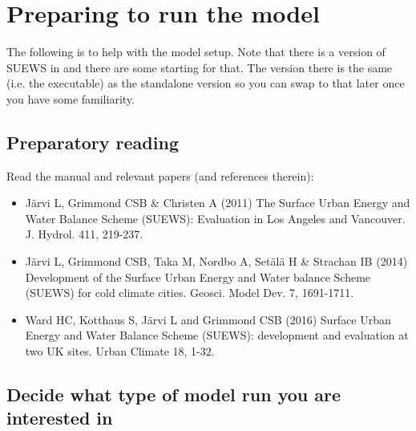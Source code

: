 \documentclass[letterpaper,10pt,english]{sphinxmanual}
\begin{document}
\chapter{Preparing to run the model}
\label{\detokenize{prepare-to-run-the-model::doc}}\label{\detokenize{prepare-to-run-the-model:preparing-to-run-the-model}}
The following is to help with the model setup. Note that there is a
version of SUEWS in 
and there are some starting
 for
that. The version there is the same (i.e. the executable) as the
standalone version so you can swap to that later once you have some
familiarity.


\section{Preparatory reading}
\label{\detokenize{prepare-to-run-the-model:preparatory-reading}}
Read the manual and relevant papers (and references therein):
\begin{itemize}
\item {} 
Järvi L, Grimmond CSB \& Christen A (2011) The Surface Urban Energy
and Water Balance Scheme (SUEWS): Evaluation in Los Angeles and
Vancouver. J. Hydrol. 411, 219-237.

\item {} 
Järvi L, Grimmond CSB, Taka M, Nordbo A, Setälä H \& Strachan IB
(2014) Development of the Surface Urban Energy and Water balance
Scheme (SUEWS) for cold climate cities. Geosci. Model Dev. 7,
1691-1711.

\item {} 
Ward HC, Kotthaus S, Järvi L and Grimmond CSB (2016) Surface Urban
Energy and Water Balance Scheme (SUEWS): development and evaluation
at two UK sites. Urban Climate 18, 1-32.

\end{itemize}



\section{Decide what type of model run you are interested in}
\label{\detokenize{prepare-to-run-the-model:decide-what-type-of-model-run-you-are-interested-in}}
\end{document}
